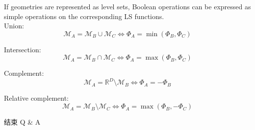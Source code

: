 \documentclass[lang=en,aspectratio=43,theme=default,logo=on]{simplebeamer}
\begin{document}
\begin{frame}
If geometries are represented as level sets, Boolean operations can be expressed as simple operations on the corresponding LS functions. \\
Union:
\begin{equation*}
    \mathcal{M}_A ={\mathcal{M}}_B \cup {\mathcal{M}}_C \Leftrightarrow {\Phi}_A =\min({\Phi}_B,{\Phi}_C)
\end{equation*}

Intersection:
\begin{equation*}
  {\mathcal{M}}_A ={\mathcal{M}}_B \cap {\mathcal{M}}_C \Leftrightarrow {\Phi}_A =\max({\Phi}_B,{\Phi}_C)
\end{equation*}

Complement:
\begin{equation*}
    {\mathcal{M}}_A	=\mathbb{R}^{D}\setminus{\mathcal{M}}_B \Leftrightarrow {\Phi}_A \displaystyle =-{\Phi}_B
\end{equation*}

Relative complement:
\begin{equation*}
    {\mathcal{M}}_A ={\mathcal{M}}_B\setminus {\mathcal{M}}_C \Leftrightarrow \displaystyle {\Phi}_A =\max({\Phi}_B,-{\Phi}_C)
\end{equation*}

\end{frame}
\begin{frame}
    \centering
    \huge 结束 Q \& A
\end{frame}
\end{document}
